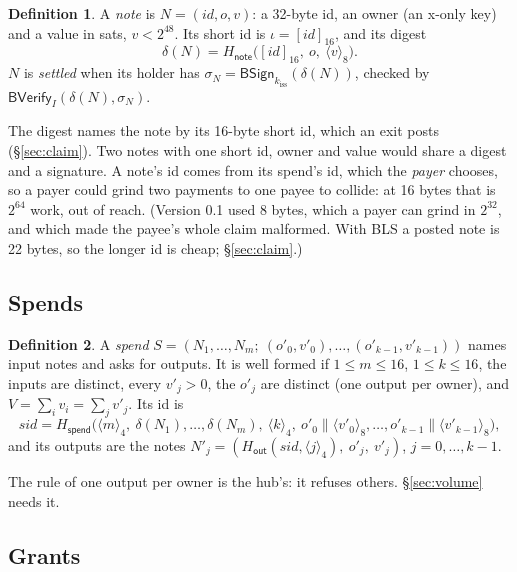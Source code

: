 \documentclass[11pt]{article}
\theoremstyle{plain}
\theoremstyle{definition}
\newtheorem{definition}{Definition}
\newcommand{\be}[2]{\langle #1\rangle_{#2}}
\newcommand{\pre}[2]{[#1]_{#2}}
\newcommand{\Ht}[1]{H_{\textsf{#1}}}
\newcommand{\kiss}{k_{\mathrm{iss}}}
\newcommand{\sid}{\mathit{sid}}
\newcommand{\BSign}{\mathsf{BSign}}
\newcommand{\BVfy}{\mathsf{BVerify}}
\begin{document}
\begin{definition}
A \emph{note} is $N = (\mathit{id}, o, v)$: a 32-byte id, an owner (an
x-only key) and a value in sats, $v < 2^{48}$. Its short id is $\iota =
\pre{\mathit{id}}{16}$, and its digest
\[
  \delta(N) = \Ht{note}\big(\pre{\mathit{id}}{16},\ o,\ \be{v}{8}\big).
\]
$N$ is \emph{settled} when its holder has $\sigma_N = \BSign_{\kiss}(\delta(N))$,
checked by $\BVfy_I(\delta(N), \sigma_N)$.
\end{definition}

The digest names the note by its 16-byte short id, which an exit posts
(\S\ref{sec:claim}). Two notes with one short id, owner and value would
share a digest and a signature. A note's id comes from its spend's id,
which the \emph{payer} chooses, so a payer could grind two payments to
one payee to collide: at 16 bytes that is $2^{64}$ work, out of reach.
(Version 0.1 used 8 bytes, which a payer can grind in $2^{32}$, and
which made the payee's whole claim malformed. With BLS a posted note is
22 bytes, so the longer id is cheap; \S\ref{sec:claim}.)

\subsection{Spends}

\begin{definition}
A \emph{spend} $S = (N_1, \dots, N_m;\ (o'_0, v'_0), \dots, (o'_{k-1},
v'_{k-1}))$ names input notes and asks for outputs. It is well formed if
$1 \le m \le 16$, $1 \le k \le 16$, the inputs are distinct, every
$v'_j > 0$, the $o'_j$ are distinct (one output per owner), and $V =
\sum_i v_i = \sum_j v'_j$. Its id is
\[
  \sid = \Ht{spend}\big(\be{m}{4},\ \delta(N_1), \dots, \delta(N_m),\
  \be{k}{4},\ o'_0 \| \be{v'_0}{8}, \dots, o'_{k-1} \| \be{v'_{k-1}}{8}\big),
\]
and its outputs are the notes $N'_j = (\Ht{out}(\sid, \be{j}{4}),\ o'_j,\
v'_j)$, $j = 0, \dots, k-1$.
\end{definition}

The rule of one output per owner is the hub's: it refuses others.
\S\ref{sec:volume} needs it.

\subsection{Grants}\label{sec:grant}
\end{document}
